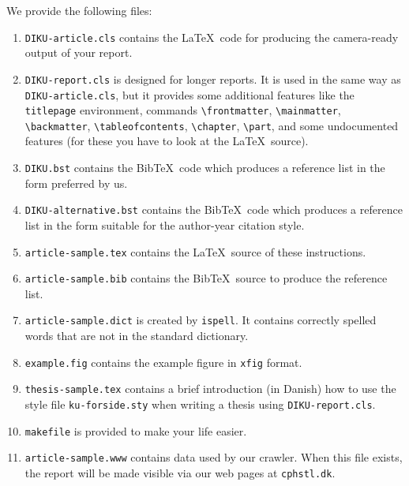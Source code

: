 \documentclass{DIKU-article}[2006/05/09]
\begin{document}
We provide the following files:
\begin{enumerate}
\item
\texttt{DIKU-article.cls} contains the \LaTeX\ code for producing the
camera-ready output of your report.

\item 
\texttt{DIKU-report.cls} is designed for longer reports.
It is used in the same way as \texttt{DIKU-article.cls}, but it
provides some additional features like the \verb|titlepage|
environment, commands \verb|\frontmatter|,
\verb|\mainmatter|, \verb|\backmatter|, \verb|\tableofcontents|,
\verb|\chapter|, \verb|\part|, and some undocumented features (for
these you have to look at the \LaTeX\ source). 
\item 
\texttt{DIKU.bst} contains the Bib\TeX\ code which produces a reference
list in the form preferred by us.

\item
\texttt{DIKU-alternative.bst} contains the Bib\TeX\ code which produces a reference list
in the form suitable for the author-year citation style.
\item
\texttt{article-sample.tex} contains the \LaTeX\ source of these
instructions.
\item
\texttt{article-sample.bib} contains the Bib\TeX\ source to produce
the reference list.

\item \texttt{article-sample.dict} is created by \texttt{ispell}.
  It contains correctly spelled words that are not in the standard
  dictionary.
\item
\texttt{example.fig} contains the example figure in
 \texttt{xfig} format.

\item
\texttt{thesis-sample.tex} contains a brief introduction (in Danish)
how to use the style file \verb|ku-forside.sty| when writing a thesis
using \verb|DIKU-report.cls|.
\item 
\texttt{makefile} is provided to make your life easier.
\item \texttt{article-sample.www} contains data used by our
  crawler. When this file exists, the report will be made visible via
  our web pages at \verb|cphstl.dk|.
\end{enumerate}
\end{document}
